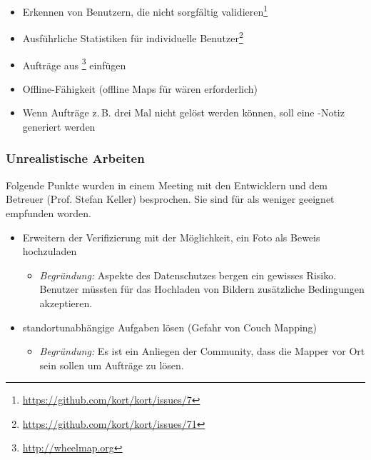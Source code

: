 \begin{itemize}
\begin{itemize}
		\end{itemize}
	\item Erkennen von Benutzern, die nicht sorgfältig validieren\footnote{\url{https://github.com/kort/kort/issues/7}}
	\item Ausführliche Statistiken für individuelle Benutzer\footnote{\url{https://github.com/kort/kort/issues/71}}
	\item Aufträge aus \footnote{\url{http://wheelmap.org}}	einfügen
	\item Offline-Fähigkeit (offline Maps für  wären erforderlich)
	\item Wenn Aufträge z.\,B. drei Mal nicht gelöst werden können, soll eine -Notiz generiert werden
\end{itemize}

\subsubsection{Unrealistische Arbeiten}
Folgende Punkte wurden in einem Meeting mit den Entwicklern und dem Betreuer (Prof. Stefan Keller) besprochen. 
Sie sind für \kort{} als weniger geeignet empfunden worden.

\begin{itemize}
	\item Erweitern der Verifizierung mit der Möglichkeit, ein Foto als Beweis hochzuladen
	\begin{itemize}
	  \item \emph{Begründung:} Aspekte des Datenschutzes bergen ein gewisses Risiko. Benutzer müssten für das Hochladen von Bildern zusätzliche Bedingungen akzeptieren.
	\end{itemize}
	\item standortunabhängige Aufgaben lösen (Gefahr von Couch Mapping)
	\begin{itemize}
	  \item \emph{Begründung:} Es ist ein Anliegen der  Community, dass die Mapper vor Ort sein sollen um Aufträge zu lösen. 
	\end{itemize}
\end{itemize}
